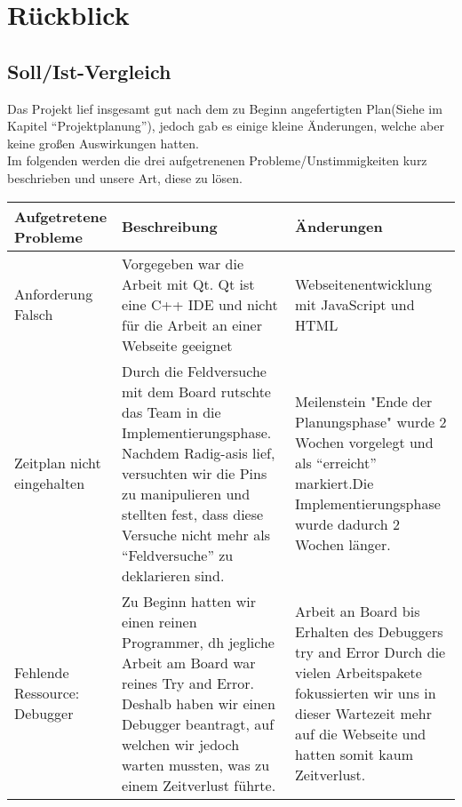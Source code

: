 
\chapter{Rückblick}

\section{Soll/Ist-Vergleich}
Das Projekt lief insgesamt gut nach dem zu Beginn angefertigten Plan(Siehe im Kapitel "`Projektplanung"'), jedoch gab es 
einige kleine Änderungen, welche aber keine großen Auswirkungen hatten. \\
Im folgenden werden die drei aufgetrenenen Probleme/Unstimmigkeiten kurz beschrieben und unsere 
Art, diese zu lösen.
\begin{center} %

\begin{longtable}{|>{\raggedright \arraybackslash}p{4.0cm}|
>{\raggedright \arraybackslash}p{4.0cm}|>{\raggedright \arraybackslash}p{4.0cm}|}

\hline
Aufgetretene Probleme & Beschreibung & Änderungen \\ \hline
Anforderung Falsch & Vorgegeben war die Arbeit mit Qt.\linebreak
Qt ist eine C++ IDE und nicht 
für die Arbeit an einer Webseite geeignet & Webseitenentwicklung mit JavaScript und HTML\\ \hline
Zeitplan nicht eingehalten & Durch die Feldversuche mit dem Board rutschte das Team in die Implementierungsphase. 
\linebreak Nachdem Radig-asis lief, versuchten wir die Pins zu manipulieren und stellten fest, dass diese Versuche 
nicht mehr als "`Feldversuche"' zu deklarieren sind. & Meilenstein "Ende der Planungsphase" wurde 2 Wochen vorgelegt und 
als "`erreicht"' markiert.\linebreak Die Implementierungsphase wurde dadurch 2 Wochen länger. \\ \hline
Fehlende Ressource: \linebreak Debugger & Zu Beginn hatten wir einen reinen Programmer, dh jegliche Arbeit am Board war reines 
Try and Error. \linebreak Deshalb haben wir einen Debugger beantragt, auf welchen wir jedoch warten mussten, was zu einem 
Zeitverlust führte. & Arbeit an Board bis Erhalten des Debuggers try and Error \linebreak Durch die vielen Arbeitspakete fokussierten 
wir uns in dieser Wartezeit mehr auf die Webseite und hatten somit kaum Zeitverlust. \\ \hline
\end{longtable}
\end{center}
